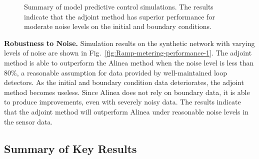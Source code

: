 \begin{figure}
	\hfill{}
	\caption{Summary of model predictive control simulations. The results indicate that the adjoint method has superior performance for moderate noise levels on the initial and boundary conditions.}
\end{figure}

\textbf{Robustness to Noise.} Simulation results on the synthetic network with varying levels of
noise are shown in Fig.~\ref{fig:Ramp-metering-performance-1}.
The adjoint method is able to outperform the Alinea method when the
noise level is less than 80\%, a reasonable assumption for data provided
by well-maintained loop detectors. As the initial and boundary condition
data deteriorates, the adjoint method becomes useless. Since Alinea
does not rely on boundary data, it is able to produce improvements,
even with severely noisy data. The results indicate that the adjoint
method will outperform Alinea under reasonable noise levels in the
sensor data.


\subsection{Summary of Key Results}

